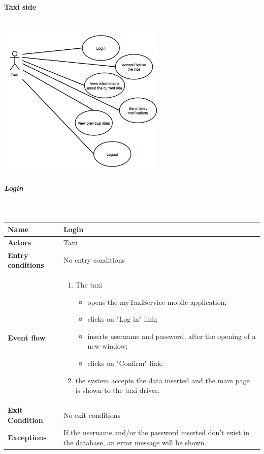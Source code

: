 \paragraph{Taxi side}
	\begin{center}
	~\\
\includegraphics[width=0.60\textwidth]{./images/UseCaseTaxi.png}~
	\end{center}
\newpage
\subparagraph{Login}
~\\[0.2cm]
\vspace{20pt}
\noindent
\begin{tabular}{l l}
 \textbf {Name} & Login  \\ \hline
 \textbf{Actors} & Taxi \\ \hline
 \textbf{Entry conditions} & No entry conditions \\ \hline
 \textbf{Event flow} & 
 \parbox{0.7\textwidth}{
 \begin{enumerate}
 \item The taxi
    \begin{itemize}
    \item opens the myTaxiService mobile application;
    \item clicks on "Log in" link;
    \item inserts username and password, after the opening of a new window;
    \item clicks on "Confirm" link;
    \end{itemize}
 \item the system accepts the data inserted and the main page is shown to the taxi driver.
 \end{enumerate}
 } \\ \hline
 \textbf{Exit Condition} & No exit conditions \\ \hline
 \textbf{Exceptions} & \parbox{0.7\textwidth}{If the username and/or the password inserted don't exist in the database, an error message will be shown.}
\end{tabular}
